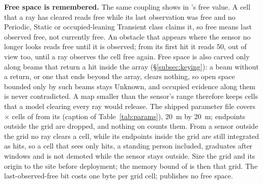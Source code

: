 \noindent\textbf{Free space is remembered.} The same coupling shows in 's free value. A cell that a ray has cleared reads free while its last observation was free and no Periodic, Static or occupied-leaning Transient class claims it, so free means last observed free, not currently free. An obstacle that appears where the sensor no longer looks reads free until it is observed; from its first hit it reads 50, out of view too, until a ray observes the cell free again. Free space is also carved only along beams that return a hit inside the array (\S\ref{subsec:keying}): a beam without a return, or one that ends beyond the array, clears nothing, so open space bounded only by such beams stays Unknown, and occupied evidence along them is never contradicted. A map smaller than the sensor's range therefore keeps cells that a model clearing every ray would release. The shipped  parameter file covers  $\times$  cells of  from its  (caption of Table~\ref{tab:params}), 20~m by 20~m; endpoints outside the grid are dropped, and nothing on  counts them. From a sensor outside the grid no ray clears a cell, while its endpoints inside the grid are still integrated as hits, so a cell that sees only hits, a standing person included, graduates after \SqLatency{} windows and is not demoted while the sensor stays outside. Size the grid and its origin to the site before deployment; the memory bound of  is then that grid. The last-observed-free bit costs one byte per grid cell;  publishes no free space.

